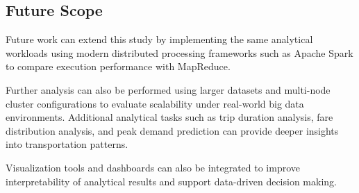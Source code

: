 \documentclass[12pt,a4paper]{report}
\begin{document}
\subsection{Future Scope}

Future work can extend this study by implementing the same analytical workloads using
modern distributed processing frameworks such as Apache Spark to compare execution
performance with MapReduce.

Further analysis can also be performed using larger datasets and multi-node cluster
configurations to evaluate scalability under real-world big data environments. Additional
analytical tasks such as trip duration analysis, fare distribution analysis, and peak demand
prediction can provide deeper insights into transportation patterns.

Visualization tools and dashboards can also be integrated to improve interpretability of
analytical results and support data-driven decision making.
\clearpage
\end{document}

